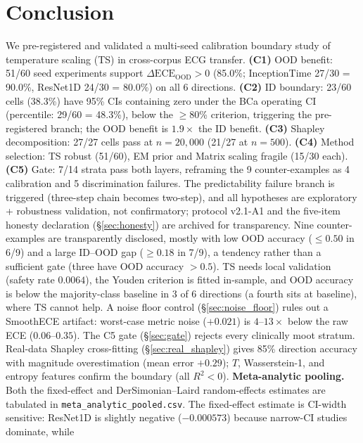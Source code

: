 \documentclass[review,12pt,nonatbib]{elsarticle}
\begin{document}
\section{Conclusion}
\label{sec:conclusion}
We pre-registered and validated a multi-seed calibration boundary study
of temperature scaling (TS) in cross-corpus ECG transfer. \textbf{(C1)}
OOD benefit: 51/60 seed experiments support
$\Delta\text{ECE}_{\text{OOD}}>0$ (85.0\%; InceptionTime 27/30 = 90.0\%,
ResNet1D 24/30 = 80.0\%) on all 6 directions. \textbf{(C2)} ID boundary:
23/60 cells (38.3\%) have 95\% CIs containing zero under the BCa
operating CI (percentile: 29/60 = 48.3\%), below the $\geq$80\%
criterion, triggering the pre-registered branch; the OOD benefit is
$1.9\times$ the ID benefit. \textbf{(C3)} Shapley decomposition: 27/27
cells pass at $n=20{,}000$ (21/27 at $n=500$). \textbf{(C4)} Method
selection: TS robust (51/60), EM prior and Matrix scaling fragile (15/30
each). \textbf{(C5)} Gate: 7/14 strata pass both layers, reframing the 9
counter-examples as 4 calibration and 5 discrimination failures. The
predictability failure branch is triggered (three-step chain becomes
two-step), and all hypotheses are exploratory + robustness validation,
not confirmatory; protocol v2.1-A1 and the five-item honesty declaration
(\S\ref{sec:honesty}) are archived for transparency. Nine
counter-examples are transparently disclosed, mostly with low OOD
accuracy ($\leq
0.50$ in 6/9) and a large ID--OOD gap ($\geq 0.18$ in 7/9), a tendency
rather than a sufficient gate (three have OOD accuracy $>0.5$). TS needs
local validation (safety rate $0.0064$), the Youden criterion is fitted
in-sample, and OOD accuracy is below the majority-class baseline in 3 of
6 directions (a fourth sits at baseline), where TS cannot help.  A noise floor control
(\S\ref{sec:noise_floor}) rules out a SmoothECE artifact: worst-case
metric noise ($+0.021$) is $4$--$13\times$ below the raw ECE
($0.06$--$0.35$). The C5 gate (\S\ref{sec:gate}) rejects every
clinically moot stratum. Real-data Shapley cross-fitting
(\S\ref{sec:real_shapley}) gives 85\% direction accuracy with magnitude
overestimation (mean error $+0.29$); $T$, Wasserstein-1, and entropy
features confirm the boundary (all $R^2 < 0$).  \textbf{Meta-analytic
pooling.} Both the fixed-effect and DerSimonian--Laird random-effects
estimates are tabulated in \texttt{meta\_analytic\_pooled.csv}. The
fixed-effect estimate is CI-width sensitive: ResNet1D is slightly
negative ($-0.000573$) because narrow-CI studies dominate, while
\end{document}
